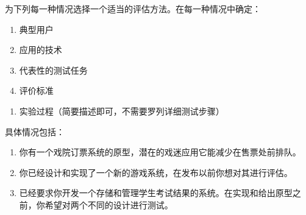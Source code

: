 \begin{problem}
为下列每一种情况选择一个适当的评估方法。在每一种情况中确定：
\vspace{-0.8em}
\begin{multicols}{4}
    \begin{enumerate}[label=\arabic*.]
        \item 典型用户
        \item 应用的技术
        \item 代表性的测试任务
        \item 评价标准
    \end{enumerate}
\end{multicols}
\vspace{-1em}
\begin{enumerate}[label=\arabic*.,start=5]
    \item 实验过程（简要描述即可，不需要罗列详细测试步骤）
\end{enumerate}

具体情况包括：
\begin{enumerate}[label=\alph*.]
    \item 你有一个戏院订票系统的原型，潜在的戏迷应用它能减少在售票处前排队。
    \item 你已经设计和实现了一个新的游戏系统，在发布以前你想对其进行评估。
    \item 已经要求你开发一个存储和管理学生考试结果的系统。在实现和给出原型之前，你希望对两个不同的设计进行测试。
\end{enumerate}
\end{problem}

